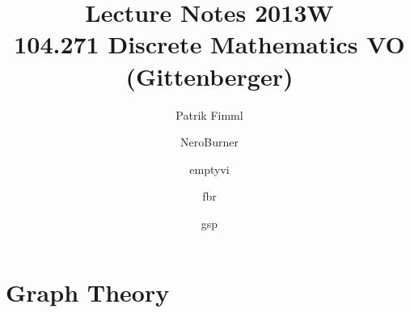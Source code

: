 \documentclass[10pt,a4paper,titlepage,oneside,final]{book}
\author{Patrik Fimml\and NeroBurner\and emptyvi\and fbr\and gsp}
\title{Lecture Notes 2013W\\ 104.271 Discrete Mathematics VO\\ (Gittenberger)}
\theoremstyle{custom}
\def\TODO#1{\fbox{TODO: #1}}
\begin{document}
\def\dt#1{\textbf{#1}}

\def\Remark.{\noindent \textbf{Remark.}}
\def\Lemma.{\noindent \textbf{Lemma.}}
\def\Theorem.{\noindent \textbf{Theorem.}}
\def\Proof.{\noindent \textbf{Proof.}}
\def\ProofForward.{\noindent \textbf{Proof (``$\Rightarrow$'').}}
\def\ProofBackward.{\noindent \textbf{Proof (``$\Leftarrow$'').}}

\newcommand\lecturedate[2][0pt]{%
  \marginpar{%
    \raisebox{2pt+#1}{%
      \vbox{%
        \rule{5em}{.4pt} \\[0pt]%
        \hspace*{1pt}%
        \scriptsize%
        \printdate{#2}%
      }%
    }%
  }%
}

\def\missingdate#1{%
  \par\strut\lecturedate{#1}%
  \TODO{Missing content from \printdate{#1}}%
  \par%
}

\isodash{--}

\def\@path#1,{#1\@ifnextchar\relax{}{\text{---}\@path}}
\def\path#1{\ensuremath{\@path#1,\relax}}

\maketitle
\tableofcontents


\chapter{Graph Theory}







%

\printindex
\end{document}
